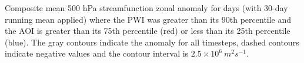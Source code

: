 \label{fig:sam_composite}
Composite mean 500 hPa streamfunction zonal anomaly for days (with 30-day running mean applied) where the PWI was greater than its 90th percentile and the AOI is greater than its 75th percentile (red) or less than its 25th percentile (blue). The gray contours indicate the anomaly for all timesteps, dashed contours indicate negative values and the contour interval is $2.5 \times 10^6 \: m^2 s^{-1}$. 